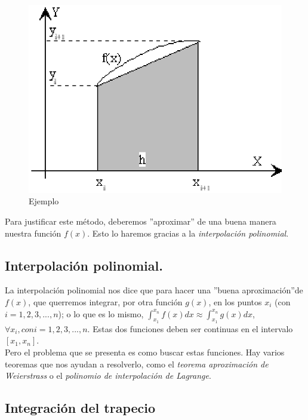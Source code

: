 \documentclass{article}
\begin{document}
    \begin{figure}[h]
      \begin{center}
	\includegraphics[scale=0.5]{areadeltrapecio.eps}
	\caption{Ejemplo}
      \end{center}
    \end{figure}

      Para justificar este método, deberemos ''aproximar'' de una buena manera nuestra función $f(x)$. Esto lo haremos gracias a la \textit{interpolación polinomial}.

    \subsection{Interpolación polinomial.}
      La interpolación polinomial nos dice que para hacer una ''buena aproximación''de $f(x)$, que querremos integrar, por otra función $g(x)$, en los puntos $x_{i}$ (con $i = 1, 2, 3, ..., n$); o lo que es lo mismo, $\int_{x_{1}}^{x_{n}}f(x)dx \approx \int_{x_{1}}^{x_{n}}g(x)dx$, $\forall x_{i}, con i = 1, 2, 3, ..., n$. Estas dos funciones deben ser continuas en el intervalo $[x_{1}, x_{n}]$.\\
      Pero el problema que se presenta es como buscar estas funciones. Hay varios teoremas que nos ayudan a resolverlo, como el \textit{teorema aproximación de Weierstrass} o el \textit{polinomio de interpolación de Lagrange}.
      
    \subsection{Integración del trapecio}
\end{document}
